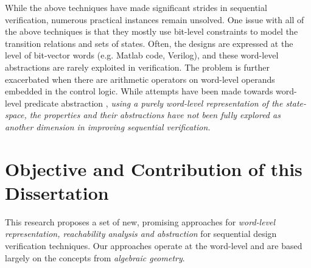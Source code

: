 While the above techniques have made significant strides in sequential
verification, numerous practical instances remain unsolved. One issue
with all of the above techniques is that they mostly use bit-level
constraints to model the transition relations and sets of 
states. Often,
the designs are expressed at the level of bit-vector words
(e.g. Matlab code, Verilog), and these word-level abstractions are
rarely exploited in verification. The problem is further exacerbated
when there are arithmetic operators on word-level operands embedded in
the control logic. While attempts have been made towards word-level
predicate abstraction \cite{jain2005word,mcmillan:cav06,mcmillan2010lazy}, 
{\it using a purely word-level representation
  of the state-space, the properties and their abstractions have not
  been fully explored as another dimension in improving sequential
  verification.}  


   



\section{Objective and Contribution of this Dissertation}
This research proposes a
set of new, promising approaches for {\it word-level representation,
reachability analysis and abstraction} for sequential design verification techniques. 
Our approaches operate at the word-level and are based
largely on the concepts from {\it algebraic geometry}. 

